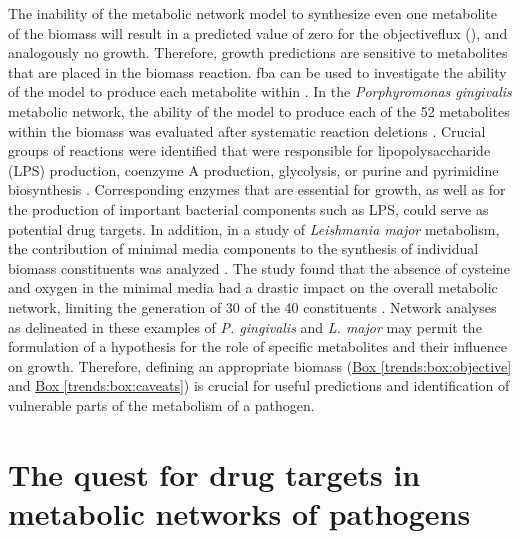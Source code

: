 

The inability of the metabolic network model to synthesize even one 
metabolite of the \gls{biomass} will result in a predicted value 
of zero for the \gls{objectiveflux} (), and analogously no growth. 
Therefore, growth predictions are sensitive to metabolites that are 
placed in the \gls{biomass} reaction. \gls{fba} can be used to investigate the 
ability of the model to produce each metabolite within . In 
the \textit{Porphyromonas gingivalis} metabolic network, the ability of the 
model to produce each of the 52 metabolites within the \gls{biomass} 
was evaluated after systematic reaction deletions \cite{Mazumdar:2009gj}. 
Crucial groups of reactions were identified that were responsible for 
lipopolysaccharide (LPS) production, coenzyme A production, glycolysis, 
or purine and pyrimidine biosynthesis \cite{Mazumdar:2009gj}. Corresponding enzymes that 
are essential for growth, as well as for the production of important 
bacterial components such as LPS, could serve as potential drug 
targets. In addition, in a study of \textit{Leishmania major} metabolism, 
the contribution of minimal media components to the synthesis of 
individual \gls{biomass} constituents was analyzed \cite{Chavali:2008gh}. The study found 
that the absence of cysteine and oxygen in the minimal media had a 
drastic impact on the overall metabolic network, limiting the 
generation of 30 of the 40  constituents \cite{Chavali:2008gh}. Network analyses 
as delineated in these examples of \textit{P. gingivalis} and \textit{L. major} may 
permit the formulation of a hypothesis for the role of specific 
metabolites and their influence on growth. Therefore, defining an 
appropriate \gls{biomass} (\hyperref[trends:box:objective]{Box \ref{trends:box:objective}} and
\hyperref[trends:box:caveats]{Box \ref{trends:box:caveats}}) is crucial for useful 
predictions and identification of vulnerable parts of the metabolism 
of a pathogen.





\section[Drug targets in metabolic networks]{The quest for drug targets in metabolic networks of pathogens}

